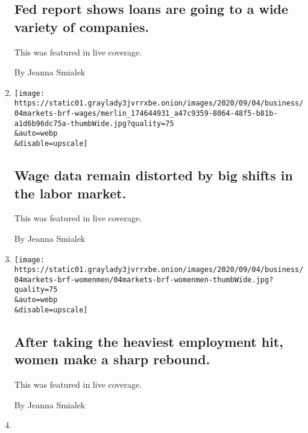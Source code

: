 \begin{enumerate}
  \hypertarget{fed-report-shows-loans-are-going-to-a-wide-variety-of-companies}{%
  \subsection{Fed report shows loans are going to a wide variety of
  companies.}\label{fed-report-shows-loans-are-going-to-a-wide-variety-of-companies}}

  This was featured in live coverage.

  By Jeanna Smialek
\item
  \href{/live/2020/09/04/business/stock-market-today-coronavirus/wage-data-remain-distorted-by-big-shifts-in-the-labor-market}{}

  \texttt{[image: https://static01.graylady3jvrrxbe.onion/images/2020/09/04/business/04markets-brf-wages/merlin\_174644931\_a47c9359-8064-48f5-b81b-a1d6b96dc75a-thumbWide.jpg?quality=75\\\&auto=webp\\\&disable=upscale]}

  \hypertarget{wage-data-remain-distorted-by-big-shifts-in-the-labor-market}{%
  \subsection{Wage data remain distorted by big shifts in the labor
  market.}\label{wage-data-remain-distorted-by-big-shifts-in-the-labor-market}}

  This was featured in live coverage.

  By Jeanna Smialek
\item
  \href{/live/2020/09/04/business/stock-market-today-coronavirus/after-taking-the-heaviest-employment-hit-women-make-a-sharp-rebound}{}

  \texttt{[image: https://static01.graylady3jvrrxbe.onion/images/2020/09/04/business/04markets-brf-womenmen/04markets-brf-womenmen-thumbWide.jpg?quality=75\\\&auto=webp\\\&disable=upscale]}

  \hypertarget{after-taking-the-heaviest-employment-hit-women-make-a-sharp-rebound}{%
  \subsection{After taking the heaviest employment hit, women make a
  sharp
  rebound.}\label{after-taking-the-heaviest-employment-hit-women-make-a-sharp-rebound}}

  This was featured in live coverage.

  By Jeanna Smialek
\item
  \href{/live/2020/09/04/business/stock-market-today-coronavirus/people-are-coming-back-into-the-labor-force-as-unemployment-sinks}{}


\end{enumerate}
